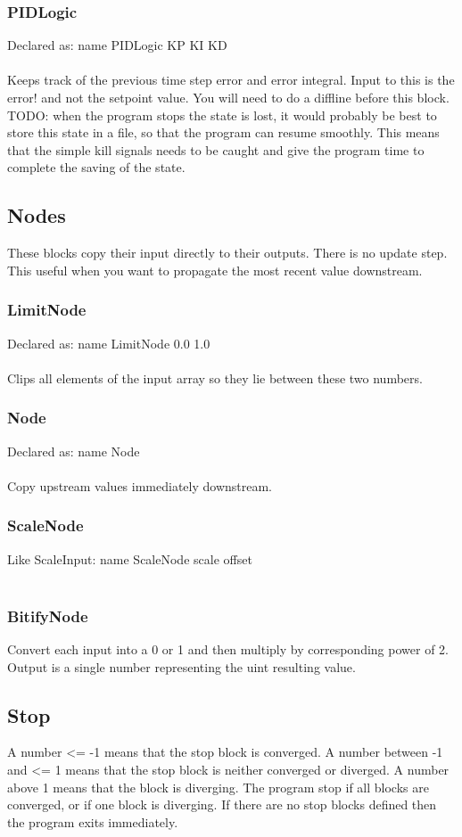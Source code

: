 \documentclass[a4paper]{article}
\begin{document}
\subsubsection{PIDLogic}
Declared as: name PIDLogic KP KI KD\\\\
Keeps track of the previous time step error and error integral. Input to this is the error! and not the setpoint value. You will need to do a diffline before this block. TODO: when the program stops the state is lost, it would probably be best to store this state in a file, so that the program can resume smoothly. This means that the simple kill signals needs to be caught and give the program time to complete the saving of the state.\\
\subsection{Nodes}
These blocks copy their input directly to their outputs. There is no update step. This useful when you want to propagate the most recent value downstream.
\subsubsection{LimitNode}
Declared as: name LimitNode 0.0 1.0\\\\
Clips all elements of the input array so they lie between these two numbers.
\subsubsection{Node}
Declared as: name Node\\\\
Copy upstream values immediately downstream.
\subsubsection{ScaleNode}
Like ScaleInput: name ScaleNode scale offset\\\\
\subsubsection{BitifyNode}
Convert each input into a 0 or 1 and then multiply by corresponding power of 2. Output is a single number representing the uint resulting value.
\subsection{Stop}
A number <= -1 means that the stop block is converged. A number between -1 and <= 1 means that the stop block is neither converged or diverged. A number above 1 means that the block is diverging. The program stop if all blocks are converged, or if one block is diverging. If there are no stop blocks defined then the program exits immediately.
\end{document}
